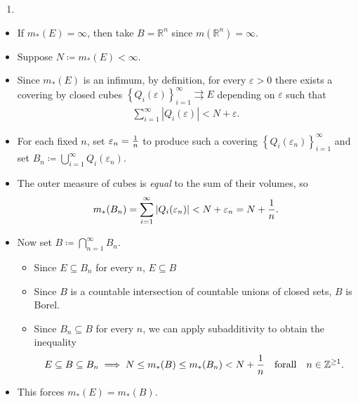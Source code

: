 \begin{solution}
\begin{enumerate}
\def\labelenumi{\alph{enumi}.}
\tightlist
\item
\end{enumerate}

\begin{itemize}
\item
  If \(m_*(E) = \infty\), then take \(B = {\mathbb{R}}^n\) since
  \(m({\mathbb{R}}^n) = \infty\).
\item
  Suppose \(N \coloneqq m_*(E) < \infty\).
\item
  Since \(m_*(E)\) is an infimum, by definition, for every
  \({\varepsilon}> 0\) there exists a covering by closed cubes
  \(\left\{{Q_i({\varepsilon})}\right\}_{i=1}^\infty \rightrightarrows E\)
  depending on \({\varepsilon}\) such that
  \begin{align*}
  \sum_{i=1}^\infty {\left\lvert {Q_i({\varepsilon})} \right\rvert} < N + {\varepsilon}
  .\end{align*}
\item
  For each fixed \(n\), set \({\varepsilon}_n = {1\over n}\) to produce
  such a covering \(\left\{{Q_i({\varepsilon}_n)}\right\}_{i=1}^\infty\)
  and set
  \(B_n \coloneqq\displaystyle\bigcup_{i=1}^\infty Q_i({\varepsilon}_n)\).
\item
  The outer measure of cubes is \emph{equal} to the sum of their
  volumes, so
  \begin{align*}
  m_*(B_n) = \sum_{i=1}^\infty {\left\lvert {Q_i({\varepsilon}_n)} \right\rvert} < N + {\varepsilon}_n = N + {1\over n}
  .\end{align*}
\item
  Now set \(B \coloneqq\displaystyle\bigcap_{n=1}^\infty B_n\).

  \begin{itemize}
  \tightlist
  \item
    Since \(E\subseteq B_n\) for every \(n\), \(E\subseteq B\)
  \item
    Since \(B\) is a countable intersection of countable unions of
    closed sets, \(B\) is Borel.
  \item
    Since \(B_n \subseteq B\) for every \(n\), we can apply
    subadditivity to obtain the inequality
    \begin{align*}
    E \subseteq B \subseteq B_n \implies
    N \leq m_*(B) \leq m_*(B_n) < N + {1\over n} {\quad \operatorname{for all} \quad} n\in {\mathbb{Z}}^{\geq 1}
    .\end{align*}
  \end{itemize}
\item
  This forces \(m_*(E) = m_*(B)\).
\end{itemize}


\end{solution}
